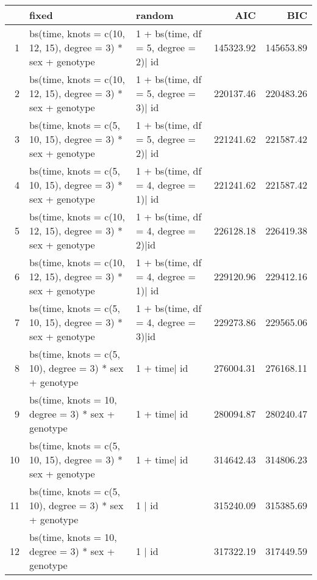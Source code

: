 \begin{table}[ht]
\centering
\begin{tabular}{rllrr}
  \hline
 & fixed & random & AIC & BIC \\ 
  \hline
1 & bs(time, knots = c(10, 12, 15), degree = 3) * sex + genotype & 1 + bs(time, df = 5, degree = 2)$|$ id & 145323.92 & 145653.89 \\ 
  2 & bs(time, knots = c(10, 12, 15), degree = 3) * sex + genotype & 1 + bs(time, df = 5, degree = 3)$|$ id & 220137.46 & 220483.26 \\ 
  3 & bs(time, knots = c(5, 10, 15), degree = 3) * sex + genotype & 1 + bs(time, df = 5, degree = 2)$|$ id & 221241.62 & 221587.42 \\ 
  4 & bs(time, knots = c(5, 10, 15), degree = 3) * sex + genotype & 1 + bs(time, df = 4, degree = 1)$|$ id & 221241.62 & 221587.42 \\ 
  5 & bs(time, knots = c(10, 12, 15), degree = 3) * sex + genotype & 1 + bs(time, df = 4, degree  = 2)$|$id & 226128.18 & 226419.38 \\ 
  6 & bs(time, knots = c(10, 12, 15), degree = 3) * sex + genotype & 1 + bs(time, df = 4, degree = 1)$|$ id & 229120.96 & 229412.16 \\ 
  7 & bs(time, knots = c(5, 10, 15), degree = 3) * sex + genotype & 1 + bs(time, df = 4, degree = 3)$|$id & 229273.86 & 229565.06 \\ 
  8 & bs(time, knots = c(5, 10), degree = 3) * sex + genotype & 1 + time$|$ id & 276004.31 & 276168.11 \\ 
  9 & bs(time, knots = 10, degree = 3) * sex + genotype & 1 + time$|$ id & 280094.87 & 280240.47 \\ 
  10 & bs(time, knots = c(5, 10, 15), degree = 3) * sex + genotype & 1 + time$|$ id & 314642.43 & 314806.23 \\ 
  11 & bs(time, knots = c(5, 10), degree = 3) * sex + genotype & 1 $|$ id & 315240.09 & 315385.69 \\ 
  12 & bs(time, knots = 10, degree = 3) * sex + genotype & 1 $|$ id & 317322.19 & 317449.59 \\ 
   \hline
\end{tabular}
\end{table}
